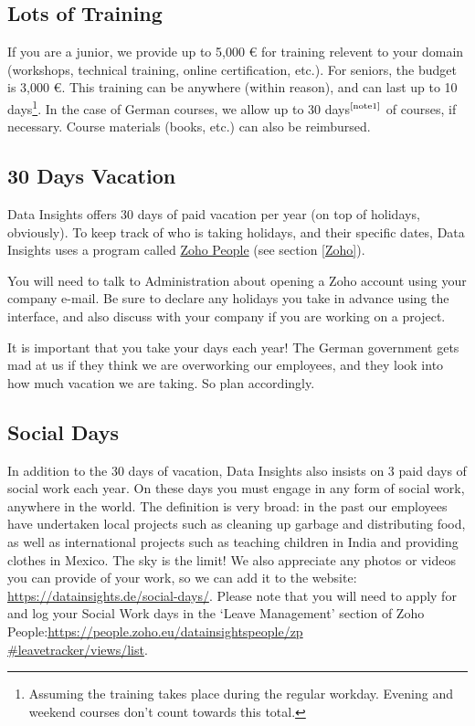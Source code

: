 \documentclass[11pt]{report}
\begin{document}
\subsection{Lots of Training}
\label{Training}
If you are a junior, we provide up to 5,000 \euro{} for training relevent to your domain (workshops, technical training, online certification, etc.). For seniors, the budget is 3,000 \euro{}. This training can be anywhere (within reason), and can last up to 10 days\footnote{\label{note1} Assuming the training takes place during the regular workday. Evening and weekend courses don't count towards this total.}. In the case of German courses, we allow up to 30 days$^{\textrm{\scriptsize \ref{note1}}}$ of courses, if necessary. Course materials (books, etc.) can also be reimbursed.

\subsection{30 Days Vacation}
\label{Vacation}
Data Insights offers 30 days of paid vacation per year (on top of holidays, obviously). To keep track of who is taking holidays, and their specific dates, Data Insights uses a program called \underline{Zoho People} (see section \ref{Zoho}).

You will need to talk to Administration about opening a Zoho account using your company e-mail. Be sure to declare any holidays you take in advance using the interface, and also discuss with your company if you are working on a project.

It is important that you take your days each year! The German government gets mad at us if they think we are overworking our employees, and they look into how much vacation we are taking. So plan accordingly.

\subsection{Social Days}
\label{social}
In addition to the 30 days of vacation, Data Insights also insists on 3 paid days of social work each year. On these days you must engage in any form of social work, anywhere in the world. The definition is very broad: in the past our employees have undertaken local projects such as cleaning up garbage and distributing food, as well as international projects such as teaching children in India and providing clothes in Mexico. The sky is the limit! We also appreciate any photos or videos you can provide of your work, so we can add it to the website: \href{https://datainsights.de/social-days/}{https://datainsights.de/social-days/}. Please note that you will need to apply for and log your Social Work days in the `Leave Management' section of Zoho People:{\scriptsize \href{https://people.zoho.eu/datainsightspeople/zp#leavetracker/views/list}{https://people.zoho.eu/datainsightspeople/zp\\\#leavetracker/views/list}}.
\end{document}

